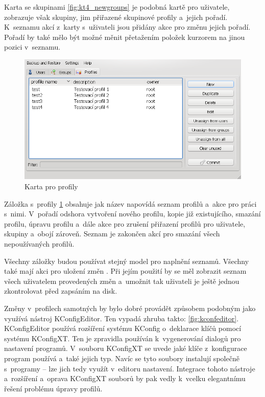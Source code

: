 Karta se skupinami \ref{fig:kt4_newgroups} je podobná kartě pro uživatele, zobrazuje však skupiny, jim přiřazené skupinové profily a~jejich pořadí. K~seznamu akcí z~karty s~uživateli jsou přidány akce pro změnu jejich pořadí. Pořadí by také mělo být možné měnit přetažením položek kurzorem na jinou pozici v~seznamu.

\begin{figure}[h]
    \centering
    \includegraphics[width=13cm]{obrazky/navrh-profiles-fixd.png}
    \caption{Karta pro profily}
    \label{fig:kt4_newprofiles}
\end{figure}

Záložka s~profily \ref{fig:kt4_newprofiles} obsahuje jak název napovídá seznam profilů a~akce pro práci s~nimi. V~pořadí odshora vytvoření nového profilu, kopie již existujícího, smazání profilu, úpravu profilu a~dále akce pro zrušení přiřazení profilů pro uživatele, skupiny a~obojí zároveň. Seznam je zakončen akcí pro smazání všech nepoužívaných profilů.

Všechny záložky budou používat stejný model pro naplnění seznamů. Všechny také mají akci pro uložení změn . Při jejím použití by se měl zobrazit seznam všech uživatelem provedených změn a~umožnit tak uživateli je ještě jednou zkontrolovat před zapsáním na disk.

Změny v~profilech samotných by bylo dobré provádět způsobem podobným jako využívá nástroj KConfigEditor. Ten vypadá zhruba takto: \ref{fig:kconfeditor}. KConfigEditor používá rozšíření systému KConfig o~deklarace klíčů pomocí systému KConfigXT. Ten je zpravidla používán k~vygenerování dialogů pro nastavení programů. V~souboru KConfigXT se uvede jaké klíče z~konfigurace program používá a~také jejich typ. Navíc se tyto soubory instalují společně s~programy -- lze jich tedy využít v~editoru nastavení. Integrace tohoto nástroje a~rozšíření a~oprava KConfigXT souborů by pak vedly k~vcelku elegantnímu řešení problému úpravy profilů.


